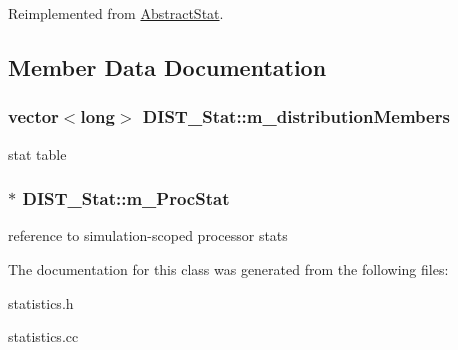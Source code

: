 Reimplemented from \hyperlink{classAbstractStat_aa4760247da47c70d7345de5d881f59cb}{AbstractStat}.



\subsection{Member Data Documentation}
\hypertarget{classDIST__Stat_a66b040153f6d5636d372b5bb3f0c6802}{
\subsubsection[{m\_\-distributionMembers}]{\setlength{\rightskip}{0pt plus 5cm}vector$<$long$>$ {\bf DIST\_\-Stat::m\_\-distributionMembers}}}
\label{classDIST__Stat_a66b040153f6d5636d372b5bb3f0c6802}
stat table \hypertarget{classDIST__Stat_a867cb02e1feb40c13b29ab79746853e6}{
\subsubsection[{m\_\-ProcStat}]{$\ast$ {\bf DIST\_\-Stat::m\_\-ProcStat}}}
\label{classDIST__Stat_a867cb02e1feb40c13b29ab79746853e6}
reference to simulation-\/scoped processor stats 

The documentation for this class was generated from the following files:\begin{DoxyCompactItemize}
\item 
statistics.h\item 
statistics.cc\end{DoxyCompactItemize}
